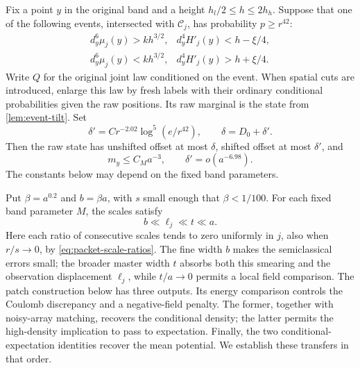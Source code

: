 Fix a point $y$ in the original band and a height
$h_l/2\leq h\leq2h_h$.  Suppose that one of the following events,
intersected with $\mathcal C_j$, has probability $p\geq r^{42}$:
\begin{equation}
 \begin{array}{ll}
 d_y^6\mu_j(y)>kh^{3/2},&d_y^4H'_j(y)<h-\xi/4,\\[2pt]
 d_y^6\mu_j(y)<kh^{3/2},&d_y^4H'_j(y)>h+\xi/4.
 \end{array}
 \label{eq:fixed-point-failures}
\end{equation}
Write $Q$ for the original joint law conditioned on the event.
When spatial cuts are introduced, enlarge this law by fresh labels with
their ordinary conditional probabilities given the raw positions.
Its raw marginal is the state from \cref{lem:event-tilt}.  Set
\[
 \delta'=Cr^{-2.02}\log^5(e/r^{42}),\qquad
 \delta=D_0+\delta'.
\]
Then the raw state has unshifted offset at most $\delta$, shifted offset
at most $\delta'$, and
\begin{equation}
 m_y\leq C_Ma^{-3},\qquad
 \delta'=o(a^{-6.98}).
 \label{eq:patch-offsets}
\end{equation}
The constants below may depend on the fixed band parameters.

Put $\beta=a^{0.2}$ and $b=\beta a$, with $s$ small enough that
$\beta<1/100$.  For each fixed band parameter $M$, the scales satisfy
\[
 b\ll\ell_j\ll t\ll a.
\]
Here each ratio of consecutive scales tends to zero uniformly in $j$,
also when $r/s\to0$, by \cref{eq:packet-scale-ratios}.
The fine width $b$ makes the semiclassical errors small; the broader master
width $t$ absorbs both this smearing and the observation displacement
$\ell_j$, while $t/a\to0$ permits a local field comparison.
The patch construction below has three outputs.  Its energy comparison
controls the Coulomb discrepancy and a negative-field penalty.  The former,
together with noisy-array matching, recovers the conditional density; the
latter permits the high-density implication to pass to expectation.
Finally, the two conditional-expectation identities recover the mean
potential.  We establish these transfers in that order.

